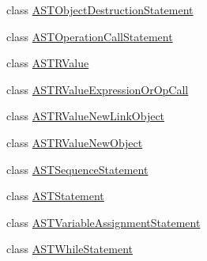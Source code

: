 \begin{DoxyCompactItemize}
\item 
class \hyperlink{classorg_1_1tzi_1_1use_1_1parser_1_1soil_1_1ast_1_1_a_s_t_object_destruction_statement}{A\-S\-T\-Object\-Destruction\-Statement}
\item 
class \hyperlink{classorg_1_1tzi_1_1use_1_1parser_1_1soil_1_1ast_1_1_a_s_t_operation_call_statement}{A\-S\-T\-Operation\-Call\-Statement}
\item 
class \hyperlink{classorg_1_1tzi_1_1use_1_1parser_1_1soil_1_1ast_1_1_a_s_t_r_value}{A\-S\-T\-R\-Value}
\item 
class \hyperlink{classorg_1_1tzi_1_1use_1_1parser_1_1soil_1_1ast_1_1_a_s_t_r_value_expression_or_op_call}{A\-S\-T\-R\-Value\-Expression\-Or\-Op\-Call}
\item 
class \hyperlink{classorg_1_1tzi_1_1use_1_1parser_1_1soil_1_1ast_1_1_a_s_t_r_value_new_link_object}{A\-S\-T\-R\-Value\-New\-Link\-Object}
\item 
class \hyperlink{classorg_1_1tzi_1_1use_1_1parser_1_1soil_1_1ast_1_1_a_s_t_r_value_new_object}{A\-S\-T\-R\-Value\-New\-Object}
\item 
class \hyperlink{classorg_1_1tzi_1_1use_1_1parser_1_1soil_1_1ast_1_1_a_s_t_sequence_statement}{A\-S\-T\-Sequence\-Statement}
\item 
class \hyperlink{classorg_1_1tzi_1_1use_1_1parser_1_1soil_1_1ast_1_1_a_s_t_statement}{A\-S\-T\-Statement}
\item 
class \hyperlink{classorg_1_1tzi_1_1use_1_1parser_1_1soil_1_1ast_1_1_a_s_t_variable_assignment_statement}{A\-S\-T\-Variable\-Assignment\-Statement}
\item 
class \hyperlink{classorg_1_1tzi_1_1use_1_1parser_1_1soil_1_1ast_1_1_a_s_t_while_statement}{A\-S\-T\-While\-Statement}
\end{DoxyCompactItemize}
